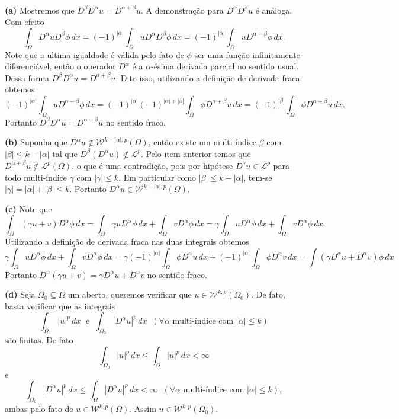 \documentclass[a4paper, 11pt]{book}
\theoremstyle{definition}
\newcommand{\cL}{\mathcal{L}}
\newcommand{\cW}{\mathcal{W}}
\begin{document}
\begin{prf}
    ~

    \textbf{(a)} Mostremos que $D^{\beta}D^{\alpha} u = D^{\alpha + \beta}u$.
    A demonstração para $D^{\alpha}D^{\beta} u$ é análoga.
    Com efeito
    \[
        \int_\Omega D^{\alpha} u D^{\beta} \phi \, dx = (-1)^{|\alpha|} \int_\Omega u D^{\alpha} D^{\beta} \phi \, dx = (-1)^{|\alpha|} \int_\Omega u D^{\alpha + \beta} \phi \,dx.
    \]
    Note que a ultima igualdade é válida pelo fato de $\phi$ ser uma função infinitamente diferenciável, então o operador $D^\alpha$ é a $\alpha$-ésima derivada parcial no sentido usual.
    Dessa forma $D^{\beta}D^{\alpha} u = D^{\alpha + \beta} u$.
    Dito isso, utilizando a definição de derivada fraca obtemos
    \[
        (-1)^{|\alpha|} \int_\Omega u D^{\alpha + \beta} \phi \,dx = (-1)^{|\alpha|}(-1)^{|\alpha| + |\beta|} \int_\Omega \phi D^{\alpha+\beta} u \,dx = (-1)^{|\beta|} \int_\Omega \phi D^{\alpha + \beta} u \,dx.
    \]
    Portanto $D^{\beta} D^{\alpha} u = D^{\alpha + \beta} u$ no sentido fraco.

    \textbf{(b)} Suponha que $D^\alpha u \not\in \cW^{k-|\alpha|,p}(\Omega)$, então existe um multi-índice $\beta$ com $|\beta| \leqslant k - |\alpha|$ tal que $D^{\beta}(D^{\alpha}u) \not\in \cL^p$.
    Pelo item anterior temos que $D^{\alpha+\beta}u \not\in \cL^p(\Omega)$, o que é uma contradição, pois por hipótese $D^{\gamma}u \in \cL^p$ para todo multi-índice $\gamma$ com $|\gamma| \leqslant k$. Em particular como $|\beta| \leqslant k - |\alpha|$, tem-se $|\gamma| = |\alpha| + |\beta| \leqslant k$.
    Portanto $D^{\alpha}u \in \cW^{k-|\alpha|,p}(\Omega)$.

    \textbf{(c)} Note que
    \[
        \int_\Omega (\gamma u + v) D^{\alpha}\phi \,dx = \int_\Omega \gamma u D^\alpha \phi \, dx + \int_\Omega v D^\alpha \phi \, dx = \gamma \int_\Omega u D^{\alpha} \phi \,dx + \int_\Omega v D^{\alpha} \phi \, dx.
    \]
    Utilizando a definição de derivada fraca nas duas integrais obtemos
    {\small
    \[
        \gamma \int_\Omega u D^{\alpha} \phi \,dx + \int_\Omega v D^{\alpha} \phi \, dx = \gamma (-1)^{|\alpha|} \int_\Omega \phi D^{\alpha} u \, dx + (-1)^{|\alpha|}\int_\Omega \phi D^{\alpha} v \, dx = \int (\gamma D^{\alpha}u + D^{\alpha}v )\phi \,dx
    \]}
    Portanto $D^{\alpha}(\gamma u + v) = \gamma D^\alpha u + D^\alpha v$ no sentido fraco.

    \textbf{(d)} Seja $\Omega_0 \subseteq \Omega$ um aberto, queremos verificar que $u \in \cW^{k,p}(\Omega_0)$.
    De fato, basta verificar que as integrais
    \[
        \int_{\Omega_0} |u|^p \, dx \;\text{ e }\; \int_{\Omega_0} |D^{\alpha}u|^p \, dx \;\; (\forall \alpha \text{ multi-índice com }|\alpha| \leqslant k)
    \]
    são finitas. De fato
    \[
        \int_{\Omega_0} |u|^p \, dx \leqslant \int_{\Omega} |u|^p \,dx < \infty
    \]
    e
    \[
        \int_{\Omega_0} |D^\alpha u|^p \, dx \leqslant \int_{\Omega} |D^\alpha u|^p \,dx < \infty \;\; (\forall \alpha \text{ multi-índice com }|\alpha| \leqslant k),
    \]
    ambas pelo fato de $u \in \cW^{k,p}(\Omega)$.
    Assim $u \in \cW^{k,p}(\Omega_0)$.


\end{prf}
\end{document}
